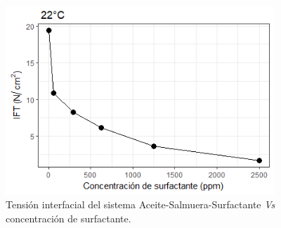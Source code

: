 \begin{figure}
    \centering
    \includegraphics[width=0.9\textwidth]{R_plot/Rplot26_cart.png}
    \caption[IFT del sistema A-S-S.]{Tensión interfacial del sistema Aceite-Salmuera-Surfactante \emph{Vs} concentración de surfactante.}
    \label{fig:IFTASS}
\end{figure}
